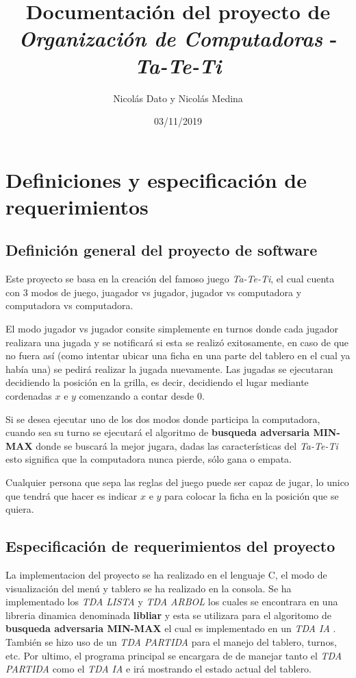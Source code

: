 \documentclass[12pt,twocolum,a4paper]{article}
\title{Documentaci\'on del proyecto de \emph{Organizaci\'on de Computadoras} - \emph{Ta-Te-Ti}}
\author{Nicol\'as Dato y Nicol\'as Medina}
\date{03/11/2019}
\begin{document}
\maketitle

\newpage
\tableofcontents
\newpage

\section{Definiciones y especificaci\'on de requerimientos}

\subsection{Definici\'on general del proyecto de software}
	Este proyecto se basa en la creaci\'on del famoso juego \emph{Ta-Te-Ti}, el cual cuenta con 3 modos de juego, juagador vs jugador, jugador vs computadora y computadora vs computadora.

	El modo jugador vs jugador consite simplemente en turnos donde cada jugador realizara una jugada y se notificar\'a si esta se realiz\'o exitosamente, en caso de que no fuera as\'i (como intentar ubicar una ficha en una parte del tablero en el cual ya hab\'ia una) se pedir\'a realizar la jugada nuevamente. Las jugadas se ejecutaran decidiendo la posici\'on en la grilla, es decir, decidiendo el lugar mediante cordenadas $x$ e $y$ comenzando a contar desde $0$.

	Si se desea ejecutar uno de los dos modos donde participa la computadora, cuando sea su turno se ejecutar\'a el algoritmo de {\bf busqueda adversaria MIN-MAX} donde se buscar\'a la mejor jugara, dadas las caracter\'isticas del \emph{Ta-Te-Ti} esto significa que la computadora nunca pierde, s\'olo gana o empata.

    Cualquier persona que sepa las reglas del juego puede ser capaz de jugar, lo unico que tendr\'a que hacer es indicar $x$ e $y$ para colocar la ficha en la posici\'on que se quiera.

\subsection{Especificaci\'on de requerimientos del proyecto}
    La implementacion del proyecto se ha realizado en el lenguaje C, el modo de visualizaci\'on del men\'u y tablero se ha realizado en la consola. Se ha implementado los {\itshape TDA LISTA} y {\itshape TDA ARBOL} los cuales se encontrara en una libreria dinamica denominada {\bf libliar} y esta se utilizara para el algoritomo de {\bf busqueda adversaria MIN-MAX} el cual es implementado en un {\itshape TDA IA} . Tambi\'en se hizo uso de un {\itshape TDA PARTIDA} para el manejo del tablero, turnos, etc. Por ultimo, el programa principal se encargara de de manejar tanto el {\itshape TDA PARTIDA} como el {\itshape TDA IA} e ir\'a mostrando el estado actual del tablero.
\end{document}
